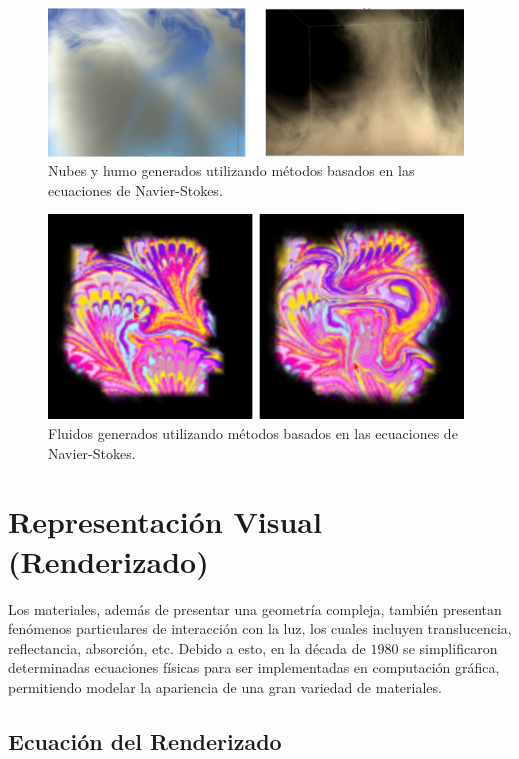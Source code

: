 \begin{figure}
\center
\includegraphics[width=11cm]{figures/fluidos1}
\caption{Nubes y humo generados utilizando métodos basados en las ecuaciones de Navier-Stokes.}
\label{fg:fluidos1}
\end{figure}

\begin{figure}
\center
\includegraphics[width=11cm]{figures/fluidos2}
\caption{Fluidos generados utilizando métodos basados en las ecuaciones de Navier-Stokes.}
\label{fg:fluidos2}
\end{figure}


\section{Representación Visual (Renderizado)}

Los materiales, además de presentar una geometría compleja, también presentan fenómenos particulares de interacción con la luz, los cuales incluyen translucencia, reflectancia, absorción, etc.
Debido a esto, en la década de $1980$ se simplificaron determinadas ecuaciones físicas para ser implementadas en computación gráfica, permitiendo modelar la apariencia de una gran variedad de materiales.

\subsection{Ecuación del Renderizado}

